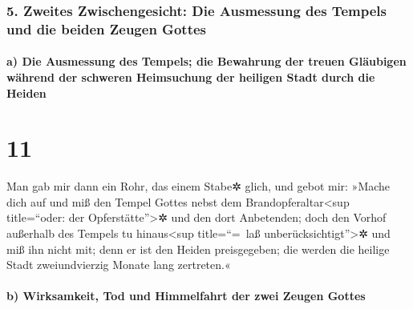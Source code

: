 \hypertarget{zweites-zwischengesicht-die-ausmessung-des-tempels-und-die-beiden-zeugen-gottes}{%
\subsubsection{5. Zweites Zwischengesicht: Die Ausmessung des Tempels
und die beiden Zeugen
Gottes}\label{zweites-zwischengesicht-die-ausmessung-des-tempels-und-die-beiden-zeugen-gottes}}

\hypertarget{a-die-ausmessung-des-tempels-die-bewahrung-der-treuen-gluxe4ubigen-wuxe4hrend-der-schweren-heimsuchung-der-heiligen-stadt-durch-die-heiden}{%
\paragraph{a) Die Ausmessung des Tempels; die Bewahrung der treuen
Gläubigen während der schweren Heimsuchung der heiligen Stadt durch die
Heiden}\label{a-die-ausmessung-des-tempels-die-bewahrung-der-treuen-gluxe4ubigen-wuxe4hrend-der-schweren-heimsuchung-der-heiligen-stadt-durch-die-heiden}}

\hypertarget{section-10}{%
\section{11}\label{section-10}}

 Man gab mir dann ein Rohr, das einem Stabe✲ glich, und
gebot mir: »Mache dich auf und miß den Tempel Gottes nebst dem
Brandopferaltar\textless sup title=``oder: der
Opferstätte''\textgreater✲ und den dort Anbetenden;  doch
den Vorhof außerhalb des Tempels tu hinaus\textless sup title=``=~laß
unberücksichtigt''\textgreater✲ und miß ihn nicht mit; denn er ist den
Heiden preisgegeben; die werden die heilige Stadt zweiundvierzig Monate
lang zertreten.«

\hypertarget{b-wirksamkeit-tod-und-himmelfahrt-der-zwei-zeugen-gottes}{%
\paragraph{b) Wirksamkeit, Tod und Himmelfahrt der zwei Zeugen
Gottes}\label{b-wirksamkeit-tod-und-himmelfahrt-der-zwei-zeugen-gottes}}


